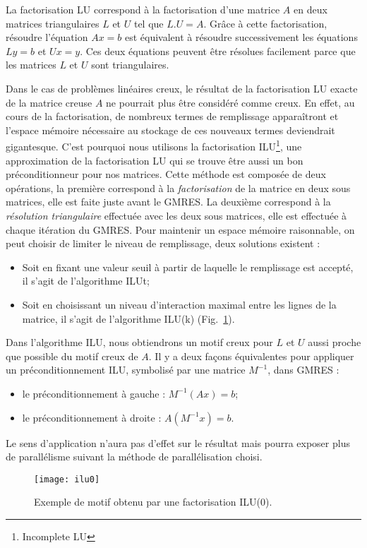 La factorisation LU correspond à la factorisation d'une matrice $A$ en deux matrices triangulaires $L$ et $U$ tel que $L.U=A$.
%
Grâce à cette factorisation, résoudre l'équation $Ax=b$ est équivalent à résoudre successivement les équations $Ly=b$ et $Ux=y$.
%
Ces deux équations peuvent être résolues facilement parce que les matrices $L$ et $U$ sont triangulaires.


Dans le cas de problèmes linéaires creux, le résultat de la factorisation LU exacte de la matrice creuse $A$ ne pourrait plus être considéré comme creux.
%
En effet, au cours de la factorisation, de nombreux termes de remplissage apparaîtront et l'espace mémoire nécessaire au stockage de ces nouveaux termes deviendrait gigantesque.
%
C'est pourquoi nous utilisons la factorisation ILU\footnote{Incomplete LU}, une approximation de la factorisation LU qui se trouve être aussi un bon préconditionneur pour nos matrices.
%
Cette méthode est composée de deux opérations, la première correspond à la {\em factorisation} de la matrice en deux sous matrices, elle est faite juste avant le GMRES.
%
La deuxième correspond à la {\em résolution triangulaire} effectuée avec les deux sous matrices, elle est effectuée à chaque itération du GMRES.
%
Pour maintenir un espace mémoire raisonnable, on peut choisir de limiter le niveau de remplissage, deux solutions existent :
\begin{itemize}
  \item Soit en fixant une valeur seuil à partir de laquelle le remplissage est accepté, il s'agit de l'algorithme ILUt;
%
  \item Soit en choisissant un niveau d'interaction maximal entre les lignes de la matrice, il s'agit de l'algorithme ILU(k) (Fig.~\ref{fig:ilu0}).
\end{itemize}
%
Dans l'algorithme ILU, nous obtiendrons un motif creux pour $L$ et $U$ aussi proche que possible du motif creux de $A$.
%
Il y a deux façons équivalentes pour appliquer un préconditionnement ILU, symbolisé par une matrice $M^{-1}$, dans GMRES :
\begin{itemize}
  \item le préconditionnement à gauche : $M^{-1}(Ax)=b$;
  \item le préconditionnement à droite : $A(M^{-1}x)=b$.
\end{itemize}
%
Le sens d'application n'aura pas d'effet sur le résultat mais pourra exposer plus de parallélisme suivant la méthode de parallélisation choisi.


\begin{figure}[t!]
  \centering
  \texttt{[image: ilu0]}
  \caption{Exemple de motif obtenu par une factorisation ILU(0).}
  \label{fig:ilu0}
\end{figure}
